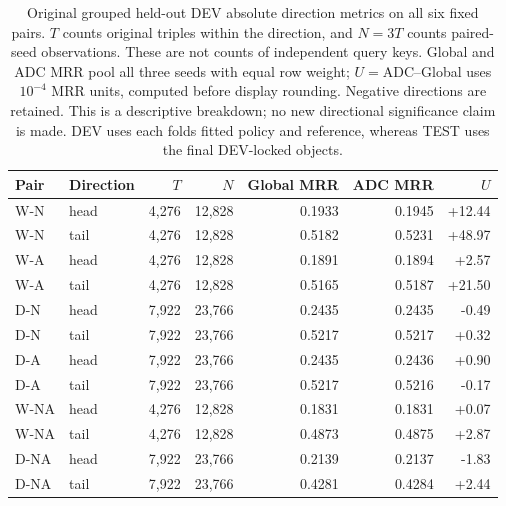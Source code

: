 \begin{table}[htbp]
\centering\footnotesize\setlength{\tabcolsep}{3pt}
\caption{Original grouped held-out DEV absolute direction metrics on all six fixed pairs. $T$ counts original triples within the direction, and $N=3T$ counts paired-seed observations. These are not counts of independent query keys. Global and ADC MRR pool all three seeds with equal row weight; $U=$ADC--Global uses $10^{-4}$ MRR units, computed before display rounding. Negative directions are retained. This is a descriptive breakdown; no new directional significance claim is made. DEV uses each fold\textquotesingle s fitted policy and reference, whereas TEST uses the final DEV-locked objects.}
\label{tab:group-direction_dev_oof}
\begin{tabular}{llrrrrr}
\toprule
Pair & Direction & $T$ & $N$ & Global MRR & ADC MRR & $U$\\
\midrule
W-N & head & 4,276 & 12,828 & 0.1933 & 0.1945 & +12.44\\
W-N & tail & 4,276 & 12,828 & 0.5182 & 0.5231 & +48.97\\
W-A & head & 4,276 & 12,828 & 0.1891 & 0.1894 & +2.57\\
W-A & tail & 4,276 & 12,828 & 0.5165 & 0.5187 & +21.50\\
D-N & head & 7,922 & 23,766 & 0.2435 & 0.2435 & -0.49\\
D-N & tail & 7,922 & 23,766 & 0.5217 & 0.5217 & +0.32\\
D-A & head & 7,922 & 23,766 & 0.2435 & 0.2436 & +0.90\\
D-A & tail & 7,922 & 23,766 & 0.5217 & 0.5216 & -0.17\\
W-NA & head & 4,276 & 12,828 & 0.1831 & 0.1831 & +0.07\\
W-NA & tail & 4,276 & 12,828 & 0.4873 & 0.4875 & +2.87\\
D-NA & head & 7,922 & 23,766 & 0.2139 & 0.2137 & -1.83\\
D-NA & tail & 7,922 & 23,766 & 0.4281 & 0.4284 & +2.44\\
\bottomrule
\end{tabular}
\end{table}
